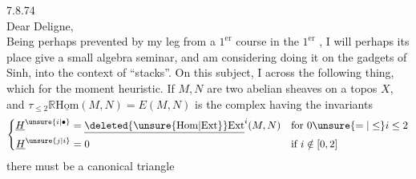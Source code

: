 
  7.8.74\\
Dear Deligne,\\

Being perhaps prevented by my leg from  a $1^{\mathrm{er}}$  course in the $1^{\mathrm{er}}$ , I will perhaps  its place give a small algebra seminar, and am considering doing it on the gadgets of  Sinh,   into the context of ``stacks''. On this subject, I  across the following thing,
which for the moment  heuristic. If $M,N$ are two abelian sheaves on a topos $X$, and $\tau_{\leq 2}\mathbb{R}\underline{\mathrm{Hom}}(M,N)=E(M,N)$ is the complex having the invariants
\[
\left\{\begin{aligned}
\underline{H}^{\unsure{i|\bullet}}&=\underline{\deleted{\unsure{\mathrm{Hom}|\mathrm{Ext}}}\mathrm{Ext}}^{i}(M,N) &&\text{for }0\unsure{=|\leq}i\leq 2\\
\underline{H}^{\unsure{j|i}}&=0 &&\text{if }i\notin[0,2]
\end{aligned}\right.
\]
there must be a canonical  triangle

